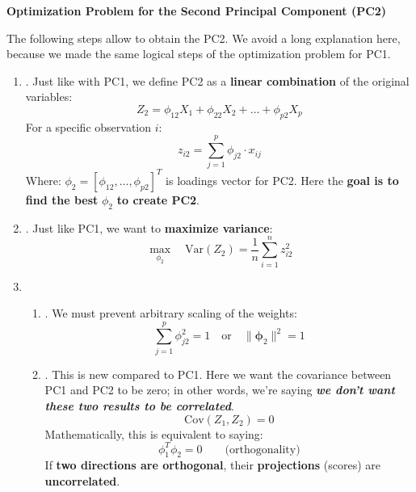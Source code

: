 \newpage

\begin{flushleft}
    \textcolor{Green3}{ \textbf{Optimization Problem for the Second Principal Component (PC2)}}
\end{flushleft}
The following steps allow to obtain the PC2. We avoid a long explanation here, because we made the same logical steps of the optimization problem for PC1.
\begin{enumerate}
    \item {}. Just like with PC1, we define PC2 as a \textbf{linear combination} of the original variables:
    \begin{equation*}
        Z_{2} = \phi_{12} X_{1} + \phi_{22} X_{2} + \dots + \phi_{p2} X_{p}
    \end{equation*}
    For a specific observation $i$:
    \begin{equation*}
        z_{i2} = \displaystyle\sum_{j=1}^{p} \phi_{j2} \cdot x_{ij}
    \end{equation*}
    Where: $\phi_{2} = \left[\phi_{12}, \dots, \phi_{p2}\right]^{T}$ is loadings vector for PC2. Here the \textbf{goal is to find the best} $\phi_{2}$ \textbf{to create PC2}.

    \item {}. Just like PC1, we want to \textbf{maximize variance}:
    \begin{equation*}
        \max_{\phi_{2}} \hspace{1em} \text{Var}\left(Z_{2}\right) = \dfrac{1}{n} \displaystyle\sum_{i=1}^{n} z_{i2}^{2}        
    \end{equation*}

    \item {}
    \begin{enumerate}
        \item {}. We must prevent arbitrary scaling of the weights:
        \begin{equation*}
            \sum_{j=1}^{p} \phi_{j2}^2 = 1 \quad \text{or} \quad \|\boldsymbol{\phi}_2\|^2 = 1
        \end{equation*}
        \item {}. This is new compared to PC1. Here we want the covariance between PC1 and PC2 to be zero; in other words, we're saying \textbf{\emph{we don't want these two results to be correlated}}.
        \begin{equation*}
            \text{Cov}(Z_{1}, Z_{2}) = 0
        \end{equation*}
        Mathematically, this is equivalent to saying:
        \begin{equation*}
            \phi_{1}^{T} \phi_{2} = 0 \hspace{2em} \text{(orthogonality)}
        \end{equation*}
        If \textbf{two directions are orthogonal}, their \textbf{projections} (scores) are \textbf{uncorrelated}.
    \end{enumerate}
\end{enumerate}
